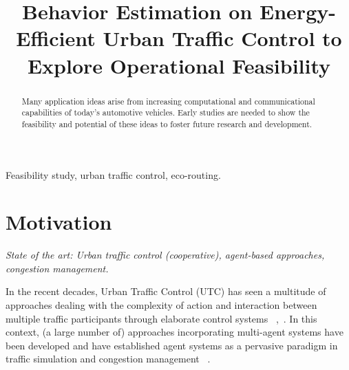 \documentclass[conference]{../cls/IEEEtran}
\begin{document}
\title{Behavior Estimation on Energy-Efficient Urban Traffic Control to Explore
Operational Feasibility}

\author{
	\and
}

\maketitle

\begin{abstract}
Many application ideas arise from increasing computational and communicational capabilities of today's automotive vehicles.
Early studies are needed to show the feasibility and potential of these ideas to foster future research and development.
\end{abstract}

\begin{IEEEkeywords}
Feasibility study, urban traffic control, eco-routing.
\end{IEEEkeywords}

\section{Motivation}

\textit{State of the art: Urban traffic control (cooperative), agent-based
approaches, congestion management.}

In the recent decades, Urban Traffic Control (UTC) has seen a multitude of
approaches dealing with the complexity of action and interaction between
multiple traffic participants through elaborate control systems
~\cite{Roozemond1999},~\cite{Chen2010}.
In this context, (a large number of) approaches incorporating multi-agent
systems have been developed and have established agent systems as a pervasive
paradigm in traffic simulation and congestion management ~\cite{Chen2010}.
\end{document}
